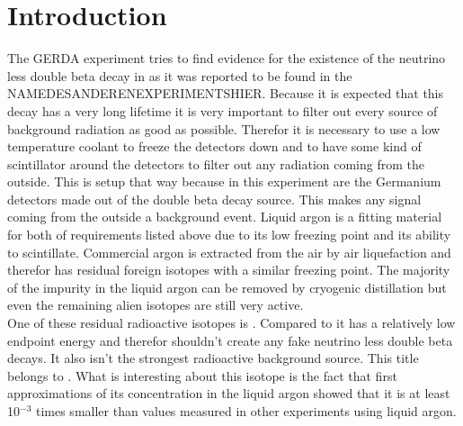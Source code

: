 





\section{Introduction}
\label{sec:intro}

The GERDA experiment tries to find evidence for the existence of the neutrino less double beta decay in  as it was reported to be found in the NAMEDESANDERENEXPERIMENTSHIER. Because it is expected that this decay has a very long lifetime it is very important to filter out every source of background radiation as good as possible. Therefor it is necessary to use a low temperature coolant to freeze the  detectors down and to have some kind of scintillator around the detectors to filter out any radiation coming from the outside. This is setup that way because in this experiment are the Germanium detectors made out of the  double beta decay source. This makes any signal coming from the outside a background event. Liquid argon is a fitting material for both of requirements listed above due to its low freezing point and its ability to scintillate. Commercial argon is extracted from the air by air liquefaction and therefor has residual foreign isotopes with a similar freezing point. The majority of the impurity in the liquid argon can be removed by cryogenic distillation but even the remaining alien isotopes are still very active.\\

One of these residual radioactive isotopes is . Compared to  it has a relatively low endpoint energy and therefor shouldn't create any fake neutrino less double beta decays. It also isn't the strongest radioactive background source. This title belongs to . What is interesting about this isotope is the fact that first approximations of its concentration in the liquid argon showed that it is at least 10\(^{-3}\) times smaller than values measured in other experiments using liquid argon. %

